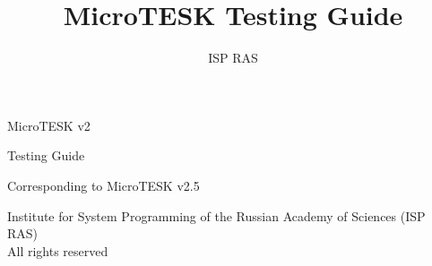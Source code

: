 \documentclass[12pt,letterpaper,extrafontsizes]{memoir}
\title{MicroTESK Testing Guide}
\author{ISP RAS}
\begin{document}

\frontmatter

\pagestyle{empty}


\vspace*{\fill}
\begin{center}
\HUGE\textsf{MicroTESK v2}\par
\end{center}

\begin{center}
\Huge\textsf{Testing Guide}\par
\end{center}

\begin{center}
\normalsize\textsf{Corresponding to MicroTESK v2.5}\par
\end{center}

\vspace*{\fill}
\clearpage


\begingroup
\footnotesize
\setlength{\parindent}{0pt}
\setlength{\parskip}{\baselineskip}
\textcopyright{} Institute for System Programming of the Russian Academy of Sciences (ISP RAS)\\
All rights reserved
\endgroup
\clearpage


\pagestyle{headings}

\tableofcontents


\mainmatter







\end{document}
